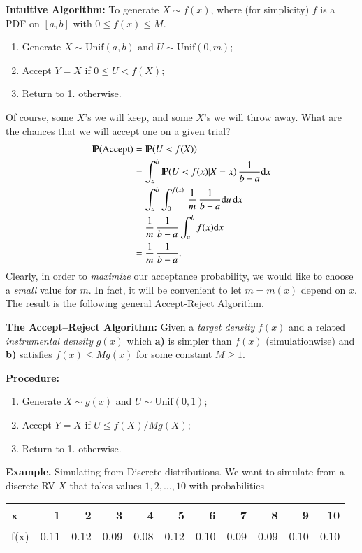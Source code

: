 \documentclass[captions=tableheading]{scrbook}
\begin{document}
 
\textbf{Intuitive Algorithm:} To generate $X \sim f(x)$, where (for simplicity) $f$ is a PDF on $[a,b]$ with $0\leq f(x)\leq M$.

\begin{enumerate}
\item Generate $X\sim\mathrm{Unif}(a,b)$ and $U\sim\mathrm{Unif}(0,m)$;
\item Accept $Y = X$ if $0 \leq U < f(X)$;
\item Return to 1. otherwise.
\end{enumerate}

Of course, some $X$'s we will keep, and some $X$'s we will throw away. What are the chances that we will accept one on a given trial?
\begin{align*}
\mathrm{I\hspace{-1.5pt}P}(\mbox{Accept}) & =\mathrm{I\hspace{-1.5pt}P}(U < f(X))\\
 & =\int_{a}^{b}\mathrm{I\hspace{-1.5pt}P}(U < f(x)|X=x)\,\frac{1}{b-a}\mathrm{d} x\\
 & =\int_{a}^{b}\int_{0}^{f(x)}\,\frac{1}{m}\,\frac{1}{b-a}\mathrm{d} u\,\mathrm{d} x\\
 & =\frac{1}{m}\,\frac{1}{b-a}\int_{a}^{b}f(x)\mathrm{d} x\\
 & =\frac{1}{m}\,\frac{1}{b-a}.
\end{align*}
Clearly, in order to \emph{maximize} our acceptance probability, we would like to choose a \emph{small} value for $m$. In fact, it will be convenient to let $m=m(x)$ depend on $x$. The result is the following general Accept-Reject Algorithm.

\textbf{The Accept--Reject Algorithm:} Given a \emph{target density} $f(x)$ and a related \emph{instrumental density} $g(x)$ which \textbf{a)} is simpler than $f(x)$ (simulationwise) and \textbf{b)} satisfies $f(x)\leq M g(x)$ for some constant $M \geq 1$.

\textbf{Procedure:}

\begin{enumerate}
\item Generate $X\sim g(x)$ and $U \sim \mathrm{Unif}(0,1)$;
\item Accept $Y=X$ if $U\leq f(X)/M g(X)$;
\item Return to 1. otherwise.
\end{enumerate}

\textbf{Example.} Simulating from Discrete distributions. We want to simulate from a discrete RV $X$ that takes values $1,2,\ldots,10$ with probabilities


\begin{center}
\begin{tabular}{lrrrrrrrrrr}
 x     &     1  &     2  &     3  &     4  &     5  &     6  &     7  &     8  &     9  &    10  \\
\hline
 f(x)  &  0.11  &  0.12  &  0.09  &  0.08  &  0.12  &  0.10  &  0.09  &  0.09  &  0.10  &  0.10  \\
\end{tabular}
\end{center}
\end{document}
